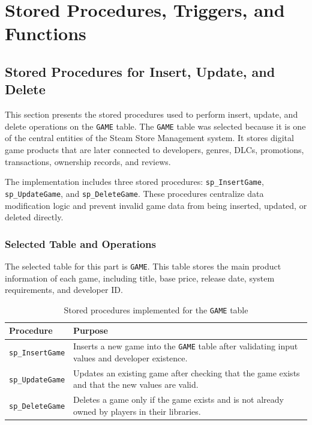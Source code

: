 \newpage
\section{Stored Procedures, Triggers, and Functions}

\subsection{Stored Procedures for Insert, Update, and Delete}

This section presents the stored procedures used to perform insert, update, and delete operations on the \texttt{GAME} table. 
The \texttt{GAME} table was selected because it is one of the central entities of the Steam Store Management system. 
It stores digital game products that are later connected to developers, genres, DLCs, promotions, transactions, ownership records, and reviews.

The implementation includes three stored procedures: \texttt{sp\_InsertGame}, \texttt{sp\_UpdateGame}, and \texttt{sp\_DeleteGame}. 
These procedures centralize data modification logic and prevent invalid game data from being inserted, updated, or deleted directly.
\subsubsection{Selected Table and Operations}

The selected table for this part is \texttt{GAME}. 
This table stores the main product information of each game, including title, base price, release date, system requirements, and developer ID.

\begin{table}[H]
\centering
\caption{Stored procedures implemented for the \texttt{GAME} table}
\label{tab:game-crud-procedures}
\begin{tabular}{|l|p{9cm}|}
\hline
\textbf{Procedure} & \textbf{Purpose} \\ \hline
\texttt{sp\_InsertGame} & Inserts a new game into the \texttt{GAME} table after validating input values and developer existence. \\ \hline
\texttt{sp\_UpdateGame} & Updates an existing game after checking that the game exists and that the new values are valid. \\ \hline
\texttt{sp\_DeleteGame} & Deletes a game only if the game exists and is not already owned by players in their libraries. \\ \hline
\end{tabular}
\end{table}
